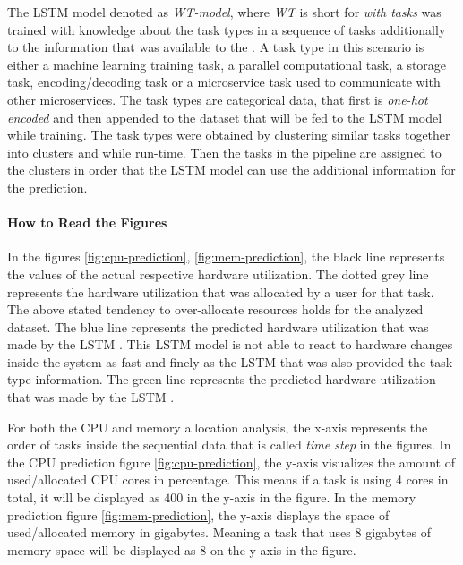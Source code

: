 \documentclass{article}
\begin{document}
    The LSTM model denoted as \emph{WT-model}, where \emph{WT} is short for \emph{with tasks} was trained with knowledge about the task types in a sequence of tasks additionally to the information
    that was available to the .
    A task type in this scenario is either a machine learning training task, a parallel computational task, 
    a storage task, encoding/decoding task or a microservice task used to communicate with other microservices.
    The task types are categorical data, that first is \emph{one-hot encoded} \cite{seger2018investigation} \cite{yu2022missing} and then appended to the dataset that will be fed to the LSTM model while training.
    The task types were obtained by clustering similar tasks together into clusters and while run-time.
    Then the tasks in the pipeline are assigned to the clusters in order that the LSTM model can use the additional information for the prediction.

  \paragraph{How to Read the Figures}
  \label{par:how-to-read-figures}

    In the figures \ref{fig:cpu-prediction}, \ref{fig:mem-prediction}, the black line represents the values of the actual respective hardware utilization.
    The dotted grey line represents the hardware utilization that was allocated by a user for that task. The above stated tendency to over-allocate resources holds for the analyzed dataset. 
    The blue line represents the predicted hardware utilization that was made by the LSTM .
    This LSTM model is not able to react to hardware changes inside the system as fast and finely as the LSTM that was also provided the task type information.
    The green line represents the predicted hardware utilization that was made by the LSTM .

    For both the CPU and memory allocation analysis, the x-axis represents the order of tasks inside the sequential data that is called \emph{time step} in the figures.
    In the CPU prediction figure \ref{fig:cpu-prediction}, the y-axis visualizes the amount of used/allocated CPU cores in percentage. This means if a task is using 4 cores in total, it will be displayed as $400$ in the y-axis in the figure.
    In the memory prediction figure \ref{fig:mem-prediction}, the y-axis displays the space of used/allocated memory in gigabytes. Meaning a task that uses $8$ gigabytes of memory space will be displayed as $8$ on the y-axis in the figure.
\end{document}
